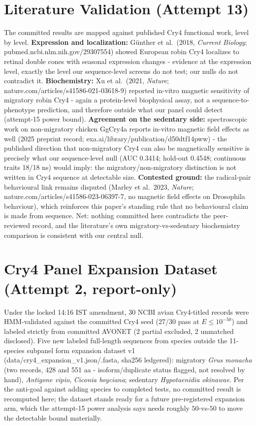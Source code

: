 \documentclass[12pt,a4paper]{article}
\begin{document}
\section{Literature Validation (Attempt 13)}
The committed results are mapped against published Cry4 functional work, level by level. \textbf{Expression and localization:} G\"unther et al.\ (2018, \emph{Current Biology}; pubmed.ncbi.nlm.nih.gov/29307554) showed European robin Cry4 localizes to retinal double cones with seasonal expression changes - evidence at the expression level, exactly the level our sequence-level screens do not test; our nulls do not contradict it. \textbf{Biochemistry:} Xu et al.\ (2021, \emph{Nature}; nature.com/articles/s41586-021-03618-9) reported in-vitro magnetic sensitivity of migratory robin Cry4 - again a protein-level biophysical assay, not a sequence-to-phenotype prediction, and therefore outside what our panel could detect (attempt-15 power bound). \textbf{Agreement on the sedentary side:} spectroscopic work on non-migratory chicken GgCry4a reports in-vitro magnetic field effects as well (2025 preprint record; exa.ai/library/publication/d50dtf14pww) - the published direction that non-migratory Cry4 can also be magnetically sensitive is precisely what our sequence-level null (AUC 0.3414; hold-out 0.4548; continuous traits 18/18 ns) would imply: the migratory/non-migratory distinction is not written in Cry4 sequence at detectable size. \textbf{Contested ground:} the radical-pair behavioural link remains disputed (Marley et al.\ 2023, \emph{Nature}; nature.com/articles/s41586-023-06397-7, no magnetic field effects on Drosophila behaviour), which reinforces this paper's standing rule that no behavioural claim is made from sequence. Net: nothing committed here contradicts the peer-reviewed record, and the literature's own migratory-vs-sedentary biochemistry comparison is consistent with our central null.

\section{Cry4 Panel Expansion Dataset (Attempt 2, report-only)}
Under the locked 14:16 IST amendment, 30 NCBI avian Cry4-titled records were HMM-validated against the committed Cry4 seed (27/30 pass at $E \leq 10^{-50}$) and labeled strictly from committed AVONET (2 partial excluded, 2 unmatched disclosed). Five new labeled full-length sequences from species outside the 11-species subpanel form expansion dataset v1 (data/cry4\_expansion\_v1.json/.fasta, sha256 ledgered): migratory \emph{Grus monacha} (two records, 428 and 551 aa - isoform/duplicate status flagged, not resolved by hand), \emph{Antigone vipio}, \emph{Ciconia boyciana}; sedentary \emph{Hypotaenidia okinawae}. Per the anti-goal against adding species to completed tests, no committed result is recomputed here; the dataset stands ready for a future pre-registered expansion arm, which the attempt-15 power analysis says needs roughly $50$-vs-$50$ to move the detectable bound materially.
\end{document}
